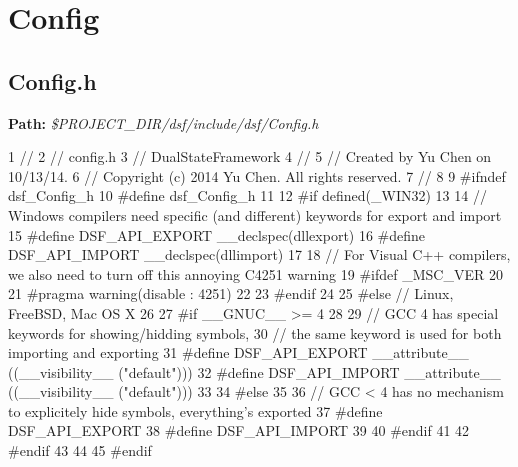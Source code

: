  \hypertarget{_dual_state_framework_DualStateFrameworkConfig}{}\section{Config}\label{_dual_state_framework_DualStateFrameworkConfig}
\hypertarget{_dual_state_framework_DualStateFrameworkConfig_h}{}\subsection{Config.\+h}\label{_dual_state_framework_DualStateFrameworkConfig_h}
{\bfseries Path\+:} {\itshape \$\+P\+R\+O\+J\+E\+C\+T\+\_\+\+D\+I\+R/dsf/include/dsf/\+Config.h} 
\begin{DoxyCodeInclude}
1 \textcolor{comment}{//}
2 \textcolor{comment}{//  config.h}
3 \textcolor{comment}{//  DualStateFramework}
4 \textcolor{comment}{//}
5 \textcolor{comment}{//  Created by Yu Chen on 10/13/14.}
6 \textcolor{comment}{//  Copyright (c) 2014 Yu Chen. All rights reserved.}
7 \textcolor{comment}{//}
8 
9 \textcolor{preprocessor}{#ifndef dsf\_Config\_h}
10 \textcolor{preprocessor}{#define dsf\_Config\_h}
11 
12 \textcolor{preprocessor}{#if defined(\_WIN32)}
13 
14 \textcolor{comment}{// Windows compilers need specific (and different) keywords for export and import}
15 \textcolor{preprocessor}{#define DSF\_API\_EXPORT \_\_declspec(dllexport)}
16 \textcolor{preprocessor}{#define DSF\_API\_IMPORT \_\_declspec(dllimport)}
17 
18 \textcolor{comment}{// For Visual C++ compilers, we also need to turn off this annoying C4251 warning}
19 \textcolor{preprocessor}{#ifdef \_MSC\_VER}
20 
21 \textcolor{preprocessor}{#pragma warning(disable : 4251)}
22 
23 \textcolor{preprocessor}{#endif}
24 
25 \textcolor{preprocessor}{#else // Linux, FreeBSD, Mac OS X}
26 
27 \textcolor{preprocessor}{#if \_\_GNUC\_\_ >= 4}
28 
29 \textcolor{comment}{// GCC 4 has special keywords for showing/hidding symbols,}
30 \textcolor{comment}{// the same keyword is used for both importing and exporting}
31 \textcolor{preprocessor}{#define DSF\_API\_EXPORT \_\_attribute\_\_ ((\_\_visibility\_\_ ("default")))}
32 \textcolor{preprocessor}{#define DSF\_API\_IMPORT \_\_attribute\_\_ ((\_\_visibility\_\_ ("default")))}
33 
34 \textcolor{preprocessor}{#else}
35 
36 \textcolor{comment}{// GCC < 4 has no mechanism to explicitely hide symbols, everything's exported}
37 \textcolor{preprocessor}{#define DSF\_API\_EXPORT}
38 \textcolor{preprocessor}{#define DSF\_API\_IMPORT}
39 
40 \textcolor{preprocessor}{#endif}
41 
42 \textcolor{preprocessor}{#endif}
43 
44 
45 \textcolor{preprocessor}{#endif}
\end{DoxyCodeInclude}
